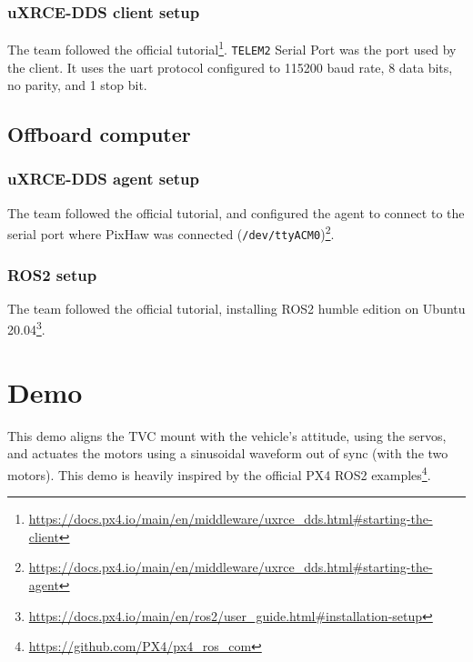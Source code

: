 \documentclass[a4paper]{article}
\begin{document}

\subsubsection{uXRCE-DDS client setup}

The team followed the official tutorial\footnote{\url{https://docs.px4.io/main/en/middleware/uxrce_dds.html\#starting-the-client}}. 
\verb|TELEM2| Serial Port was the port used by the client. It uses the uart protocol configured to 115200 baud rate, 8 data bits, no parity, and 1 stop bit. 

\subsection{Offboard computer}

\subsubsection{uXRCE-DDS agent setup}

The team followed the official tutorial, and configured the agent to connect to the serial port where PixHaw was connected (\verb|/dev/ttyACM0|)\footnote{\url{https://docs.px4.io/main/en/middleware/uxrce_dds.html\#starting-the-agent}}. 

\subsubsection{ROS2 setup}

The team followed the official tutorial, installing ROS2 humble edition on Ubuntu 20.04\footnote{\url{https://docs.px4.io/main/en/ros2/user_guide.html\#installation-setup}}. 



\clearpage
\section{Demo}
\label{sec::demo}

This demo aligns the TVC mount with the vehicle's attitude, using the servos, and actuates the motors using a sinusoidal waveform out of sync (with the two motors). 
This demo is heavily inspired by the official PX4 ROS2 examples\footnote{\url{https://github.com/PX4/px4_ros_com}}. 
\end{document}
